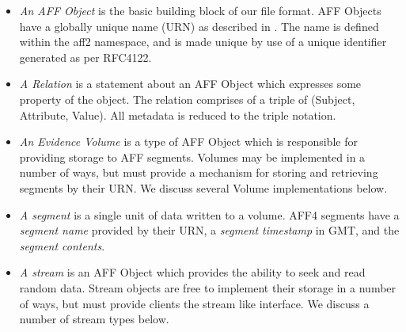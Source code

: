 \documentclass[10pt, conference]{IEEEtran}
\begin{document}
\begin{itemize}
\item \emph{An AFF Object} is the basic building block of our
file format. AFF Objects have a globally unique name (URN) as described in
\cite{RFC1737}. The name is defined within the aff2 namespace, and is
made unique by use of a unique identifier generated as per
RFC4122\cite{rfc4122}.

\item \emph{A Relation} is a statement about an AFF Object which
expresses some property of the object. The relation comprises of a
triple of (Subject, Attribute, Value). All metadata is reduced to the
triple notation.

\item \emph{An Evidence Volume} is a type of AFF Object which is
responsible for providing storage to AFF segments. Volumes may be
implemented in a number of ways, but must provide a mechanism for
storing and retrieving segments by their URN. We discuss several
Volume implementations below.

\item \emph{A segment} is a single unit of data written to a volume. AFF4
  segments have a \emph{segment name} provided by their URN, a
  \emph{segment timestamp} in GMT, and the \emph{segment contents}.

\item \emph{A stream} is an AFF Object which provides the ability to
seek and read random data. Stream objects are free to implement their storage
in a number of ways, but must provide clients the stream like
interface. We discuss a number of stream types below.






\end{itemize}
\end{document}
